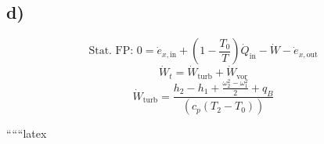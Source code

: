 

\subsection*{d)}
\[
\text{Stat. FP: } 0 = \dot{e}_{x, \text{in}} + \left( 1 - \frac{T_0}{T} \right) \dot{Q}_{\text{in}} - \dot{W} - \dot{e}_{x, \text{out}}
\]
\[
\dot{W}_t = \dot{W}_{\text{turb}} + \dot{W}_{\text{vor}}
\]
\[
\dot{W}_{\text{turb}} = \frac{h_2 - h_1 + \frac{\omega_2^2 - \omega_1^2}{2} + q_B}{(c_p (T_2 - T_0))}
\]

``````latex